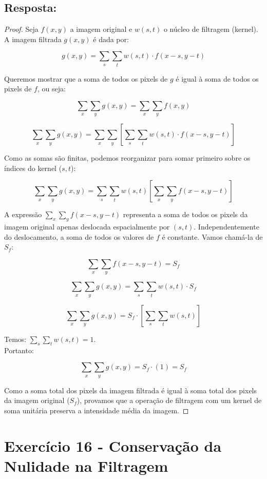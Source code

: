 \documentclass[a4paper,12pt]{article}
\begin{document}
\subsection*{Resposta:}

\bigskip

\begin{proof}

Seja $f(x, y)$ a imagem original e $w(s, t)$ o núcleo de filtragem (kernel). A imagem filtrada $g(x, y)$ é dada por:

$$g(x, y) = \sum_{s} \sum_{t} w(s, t) \cdot f(x-s, y-t)$$

Queremos mostrar que a soma de todos os pixels de $g$ é igual à soma de todos os pixels de $f$, ou seja:


$$\sum_{x} \sum_{y} g(x, y) = \sum_{x} \sum_{y} f(x, y)$$


$$\sum_{x} \sum_{y} g(x, y) = \sum_{x} \sum_{y} \left[ \sum_{s} \sum_{t} w(s, t) \cdot f(x-s, y-t) \right]$$


Como as somas são finitas, podemos reorganizar para somar primeiro sobre os índices do kernel ($s, t$):

$$\sum_{x} \sum_{y} g(x, y) = \sum_{s} \sum_{t} w(s, t) \left[ \sum_{x} \sum_{y} f(x-s, y-t) \right]$$


A expressão $\sum_{x} \sum_{y} f(x-s, y-t)$ representa a soma de todos os pixels da imagem original apenas deslocada espacialmente por $(s, t)$. Independentemente do deslocamento, a soma de todos os valores de $f$ é constante. Vamos chamá-la de $S_f$:

$$\sum_{x} \sum_{y} f(x-s, y-t) = S_f$$


$$\sum_{x} \sum_{y} g(x, y) = \sum_{s} \sum_{t} w(s, t) \cdot S_f$$


$$\sum_{x} \sum_{y} g(x, y) = S_f \cdot \left[ \sum_{s} \sum_{t} w(s, t) \right]$$


Temos: $\sum_{s} \sum_{t} w(s, t) = 1$.\\

Portanto:

$$\sum_{x} \sum_{y} g(x, y) = S_f \cdot (1) = S_f$$

Como a soma total dos pixels da imagem filtrada é igual à soma total dos pixels da imagem original ($S_f$), provamos que a operação de filtragem com um kernel de soma unitária preserva a intensidade média da imagem. 

\end{proof}


\newpage
\section*{Exercício 16 - Conservação da Nulidade na Filtragem}
\end{document}
